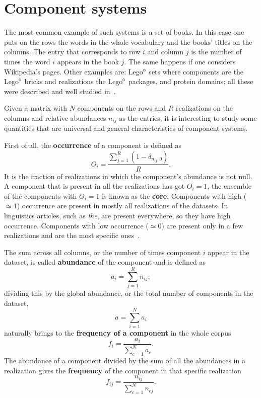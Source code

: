 \section{Component systems}
The most common example of such systems is a set of books. In this case one puts on the rows the words in the whole vocabulary and the books' titles on the columns. The entry that corresponds to row $i$ and column $j$ is the number of times the word $i$ appears in the book $j$. The same happens if one considers Wikipedia's pages. Other examples are: Lego$\textsuperscript{\tiny\textregistered}$ sets where components are the Lego$\textsuperscript{\tiny\textregistered}$ bricks and realizations the Lego$\textsuperscript{\tiny\textregistered}$ packages, and protein domains; all these were described and well studied in~\cite{mazzolini2018heaps, Mazzolini2018zipf}.

Given a matrix with $N$ components on the rows and $R$ realizations on the columns and relative abundances $n_{ij}$ as the entries, it is interesting to study some quantities that are universal and general characteristics of component systems.

First of all, the \textbf{occurrence} of a component is defined as 
\begin{equation}\label{eq:occurrence}
O_i=\frac{\sum_{j=1}^{R}(1-\delta_{n_{ij},0})}{R}.
\end{equation}
It is the fraction of realizations in which the component's abundance is not null. A component that is present in all the realizations has got $O_i=1$, the ensemble of the components with $O_i=1$ is known as the \textbf{core}. Components with high ($\simeq 1$) occurrence are present in mostly all realizations of the datasets. In linguistics articles, such as \textit{the}, are present everywhere, so they have high occurrence. Components with low occurrence ($\simeq 0$) are present only in a few realizations and are the most specific ones~\cite{altmann2016statistical}.

The sum across all columns, or the number of times component $i$ appear in the dataset, is called \textbf{abundance} of the component and is defined as
\begin{equation}\label{eq:abundance}
a_i=\sum_{j=1}^{R}n_{ij};
\end{equation}
dividing this by the global abundance, or the total number of components in the dataset,
\begin{equation}
  a=\sum_{i=1}^{N}a_i
\end{equation}
naturally brings to the \textbf{frequency of a component} in the whole corpus
\begin{equation}\label{eq:fi}
f_i=\frac{a_i}{\sum_{c=1}^{N}a_{c}}.
\end{equation}
The abundance of a component divided by the sum of all the abundances in a realization gives the \textbf{frequency} of the component in that specific realization
\begin{equation}
f_{ij}=\frac{n_{ij}}{\sum_{c=1}^{N}n_{cj}}.
\end{equation}

